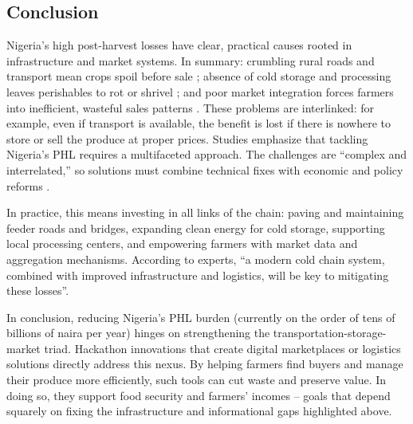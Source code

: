 {\subsection{Conclusion}

Nigeria’s high post-harvest losses have clear, practical causes rooted in infrastructure and market systems. In summary: crumbling rural roads and transport mean crops spoil before sale
\citep{PinnacleTimes2024, VoiceofNigeria2023}
; absence of cold storage and processing leaves perishables to rot or shrivel
\citep{Ikegwuonu2018, OTACCWA2025}
; and poor market integration forces farmers into inefficient, wasteful sales patterns
\citep{FarmSupportSolutions2025}. These problems are interlinked: for example, even if transport is available, the benefit is lost if there is nowhere to store or sell the produce at proper prices. Studies emphasize that tackling Nigeria’s PHL requires a multifaceted approach. The challenges are “complex and interrelated,” so solutions must combine technical fixes with economic and policy reforms
\citep{Ikegwuonu2018, Abulude2024}.
\vspace{\myvspace}

In practice, this means investing in all links of the chain: paving and maintaining feeder roads and bridges, expanding clean energy for cold storage, supporting local processing centers, and empowering farmers with market data and aggregation mechanisms. According to experts, “a modern cold chain system, combined with improved infrastructure and logistics, will be key to mitigating these losses”\citep{Ikegwuonu2018}.
\vspace{\myvspace}

In conclusion, reducing Nigeria’s PHL burden (currently on the order of tens of billions of naira per year) hinges on strengthening the transportation-storage-market triad. Hackathon innovations that create digital marketplaces or logistics solutions directly address this nexus. By helping farmers find buyers and manage their produce more efficiently, such tools can cut waste and preserve value. In doing so, they support food security and farmers’ incomes – goals that depend squarely on fixing the infrastructure and informational gaps highlighted above.
}
